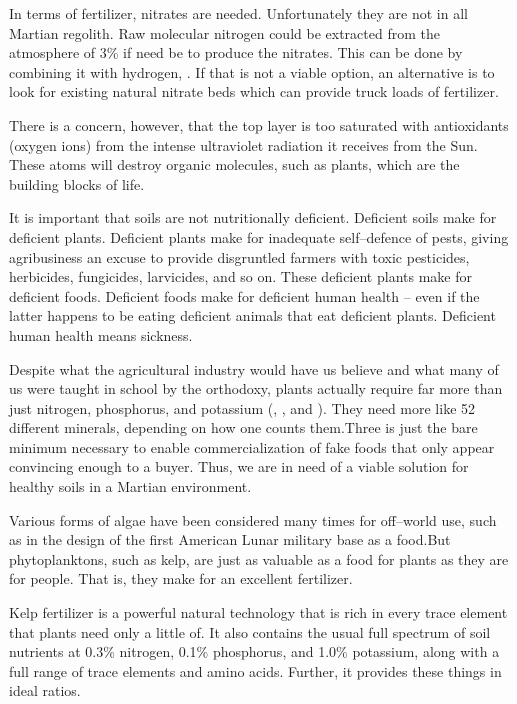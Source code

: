 In terms of fertilizer, nitrates are needed. Unfortunately they are not in all Martian regolith. Raw molecular nitrogen could be extracted from the atmosphere of 3\% if need be to produce the nitrates. This can be done by combining it with hydrogen, . If that is not a viable option, an alternative is to look for existing natural nitrate beds which can provide truck loads of fertilizer.

There is a concern, however, that the top layer is too saturated with antioxidants (oxygen ions) from the intense ultraviolet radiation it receives from the Sun. These atoms will destroy organic molecules, such as plants, which are the building blocks of life.

It is important that soils are not nutritionally deficient. Deficient soils make for deficient plants. Deficient plants make for inadequate self--defence of pests, giving agribusiness an excuse to provide disgruntled farmers with toxic pesticides, herbicides, fungicides, larvicides, and so on. These deficient plants make for deficient foods. Deficient foods make for deficient human health -- even if the latter happens to be eating deficient animals that eat deficient plants. Deficient human health means sickness.

Despite what the agricultural industry would have us believe and what many of us were taught in school by the orthodoxy, plants actually require far more than just nitrogen, phosphorus, and potassium (, , and ). They need more like 52 different minerals, depending on how one counts them. Three is just the bare minimum necessary to enable commercialization of fake foods that only appear convincing enough to a buyer. Thus, we are in need of a viable solution for healthy soils in a Martian environment.

Various forms of algae have been considered many times for off--world use, such as in the design of the first American Lunar military base as a food. But phytoplanktons, such as kelp, are just as valuable as a food for plants as they are for people. That is, they make for an excellent fertilizer. 

Kelp fertilizer is a powerful natural technology that is rich in every trace element that plants need only a little of. It also contains the usual full spectrum of soil nutrients at 0.3\% nitrogen, 0.1\% phosphorus, and 1.0\% potassium, along with a full range of trace elements and amino acids. Further, it provides these things in ideal ratios.

